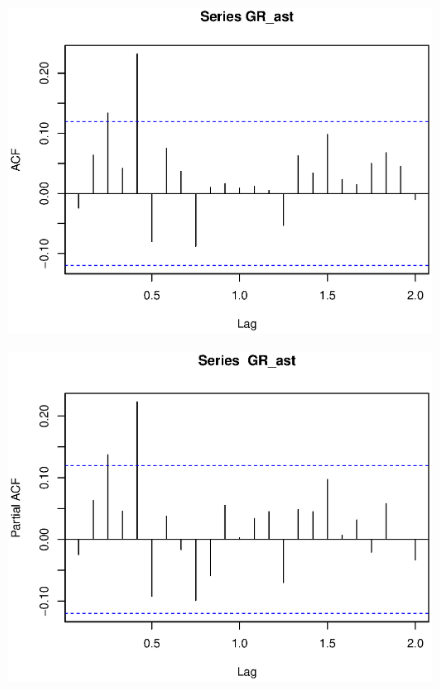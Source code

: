 \documentclass[10pt]{article}
\begin{document}
\begin{figure}[h!]
\begin{multicols}{2}  
    \begin{minipage}[h]{0.5\textwidth} 
        \centering   
        \includegraphics[width=1\textwidth]{pic/acf(gr_ast)}   
           \label{fig:apegrast:a}   
    \end{minipage}
    \begin{minipage}[h]{0.5\textwidth}   
        \centering   
        \includegraphics[width=1\textwidth]{pic/pacf(gr_ast)}   
        \label{fig:pierce:b}   
    \end{minipage}



\end{multicols}
\end{figure}
\end{document}
